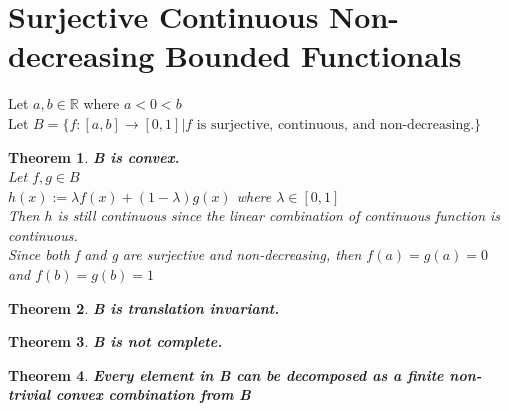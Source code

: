 \documentclass[12pt]{extarticle}
\theoremstyle{plain}
\newtheorem{thm}{Theorem}[section]
\theoremstyle{Definition}
\theoremstyle{Definition}
\theoremstyle{plain}
\begin{document}
\section{Surjective Continuous Non-decreasing Bounded Functionals}
	Let $a,b \in \mathbb{R}$ where $a < 0 < b$ \\ 
	Let $B = \{f : [a,b] \to [0,1] | f \text{ is surjective, continuous, and non-decreasing.}\}$ \\ 
	\begin{thm} \textbf{B is convex. } \\
			Let $f,g \in B$ \\ 
			$h(x) := \lambda f(x) + (1-\lambda)g(x)$ where $\lambda \in [0,1]$ \\ 
			Then $h$ is still continuous since the linear combination of continuous function is continuous.  \\
			Since both f and g are surjective and non-decreasing, then $f(a) = g(a) = 0$ and $f(b) = g(b) = 1$
	\end{thm}
	\begin{thm} \textbf{B is translation invariant.} \\
	
	\end{thm}
	\begin{thm} \textbf{B is not complete.} \\
	
	\end{thm}
	\begin{thm} \textbf{Every element in B can be decomposed as a finite non-trivial convex combination from B} \\
	
	\end{thm}
\end{document}
